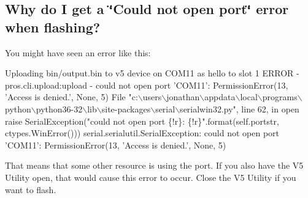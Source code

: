 \subsection*{Why do I get a \char`\"{}\+Could not open port\char`\"{} error when flashing?}

You might have seen an error like this\+:


\begin{DoxyCode}
Uploading bin/output.bin to v5 device on COM11 as hello to slot 1
ERROR - pros.cli.upload:upload - could not open port 'COM11': PermissionError(13, 'Access is denied.',
       None, 5)
File "c:\(\backslash\)users\(\backslash\)jonathan\(\backslash\)appdata\(\backslash\)local\(\backslash\)programs\(\backslash\)python\(\backslash\)python36-32\(\backslash\)lib\(\backslash\)site-packages\(\backslash\)serial\(\backslash\)serialwin32.py",
       line 62, in open
  raise SerialException("could not open port \{!r\}: \{!r\}".format(self.portstr, ctypes.WinError()))
serial.serialutil.SerialException: could not open port 'COM11': PermissionError(13, 'Access is denied.',
       None, 5)
\end{DoxyCode}


That means that some other resource is using the port. If you also have the V5 Utility open, that would cause this error to occur. Close the V5 Utility if you want to flash. 